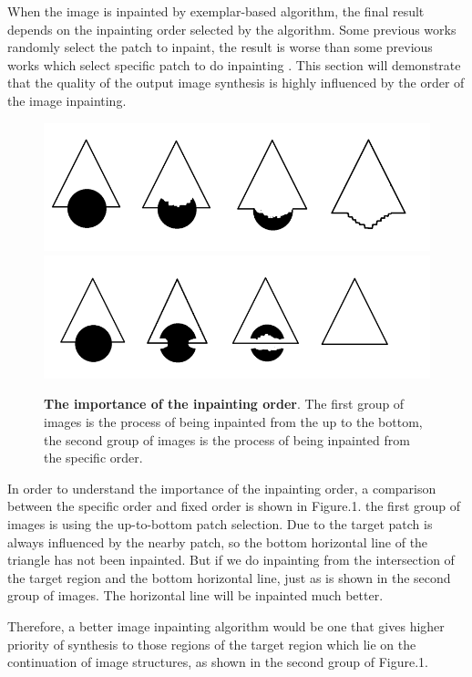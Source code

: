 When the image is inpainted by exemplar-based algorithm, the final result depends on the inpainting order selected by the algorithm. Some previous works randomly select the patch to inpaint, the result is worse than some previous works which select specific patch to do inpainting \cite{sivip16}. This section will demonstrate that the quality of
the output image synthesis is highly influenced by the order of the image inpainting. 
\begin{figure}
	\centering
	\includegraphics[width=0.94\linewidth]{order1.jpg}
	\includegraphics[width=1.0\linewidth]{order2.jpg}
	\caption{\textbf{The importance of the inpainting order}. The first group of images is the process of being inpainted from the up to the bottom, the second group of images is the process of being inpainted from the specific order.}
\end{figure}

In order to understand the importance of the inpainting order, a comparison between the specific order and fixed order is shown in Figure.1. the first group of images is using the up-to-bottom patch selection. Due to the target patch is always influenced by the nearby patch, so the bottom horizontal line of the triangle has not been inpainted. But if we do inpainting from the intersection of the target region and the bottom horizontal line, just as is shown in the second group of images. The horizontal line will be inpainted much better.

Therefore, a better image inpainting algorithm would be one that gives higher priority of synthesis to those regions of the target region which lie on
the continuation of image structures, as shown in the second group of Figure.1. 

